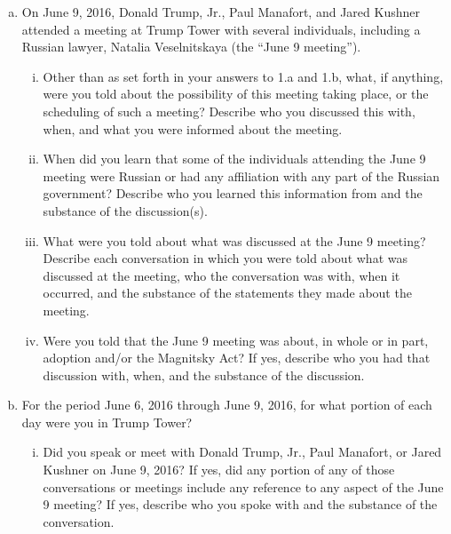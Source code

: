 \begin{enumerate}[a.]
\begin{enumerate}[i.]
\end{enumerate}

\item On June 9, 2016, Donald Trump, Jr., Paul Manafort, and Jared Kushner attended a meeting at Trump Tower with several individuals, including a Russian lawyer, Natalia Veselnitskaya (the “June 9 meeting”).

\begin{enumerate}[i.]

\item Other than as set forth in your answers to 1.a and 1.b, what, if anything, were you told about the possibility of this meeting taking place, or the scheduling of such a meeting?
Describe who you discussed this with, when, and what you were informed about the meeting.

\item When did you learn that some of the individuals attending the June 9 meeting were Russian or had any affiliation with any part of the Russian government?
Describe who you learned this information from and the substance of the discussion(s).

\item What were you told about what was discussed at the June 9 meeting?
Describe each conversation in which you were told about what was discussed at the meeting, who the conversation was with, when it occurred, and the substance of the statements they made about the meeting.

\item Were you told that the June 9 meeting was about, in whole or in part, adoption and/or the Magnitsky Act?
If yes, describe who you had that discussion with, when, and the substance of the discussion.

\end{enumerate}

\item For the period June 6, 2016 through June 9, 2016, for what portion of each day were you in Trump Tower?

\begin{enumerate}[i.]

\item Did you speak or meet with Donald Trump, Jr., Paul Manafort, or Jared Kushner on June 9, 2016?
If yes, did any portion of any of those conversations or meetings include any reference to any aspect of the June 9 meeting?
If yes, describe who you spoke with and the substance of the conversation.

\end{enumerate}


\end{enumerate}
